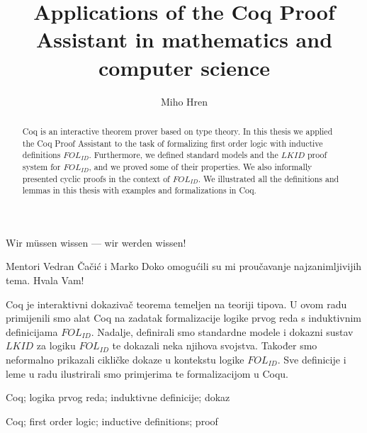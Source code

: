 \documentclass[diplomskirad, upload]{fer}
\title{Applications of the Coq Proof Assistant in mathematics and computer science}
\author{Miho Hren}
\theoremstyle{definition}
\theoremstyle{remark}
\begin{document}
\maketitle
{}

\begin{zahvale}
  \begin{center}
    \begin{huge}
      Wir m\"{u}ssen wissen --- wir werden wissen!
    \end{huge}
    Mentori Vedran Čačić i Marko Doko omogućili su mi proučavanje najzanimljivijih tema. Hvala Vam!
  \end{center}
\end{zahvale}

\mainmatter{}

\tableofcontents











\begin{sazetak}
  Coq je interaktivni dokazivač teorema temeljen na teoriji tipova.
  U ovom radu primijenili smo alat Coq na zadatak formalizacije
  logike prvog reda s induktivnim definicijama \(\mathit{FOL}_{\mathit{ID}}\). Nadalje,
  definirali smo standardne modele i dokazni sustav \(\mathit{LKID}\) za logiku \(\mathit{FOL}_{\mathit{ID}}\) te
  dokazali neka njihova svojstva. Također smo neformalno prikazali cikličke dokaze
  u kontekstu logike \(\mathit{FOL}_{\mathit{ID}}\).
  Sve definicije i leme u radu ilustrirali smo primjerima te formalizacijom u Coqu.  
\end{sazetak}

\begin{kljucnerijeci}
  Coq; logika prvog reda; induktivne definicije; dokaz
\end{kljucnerijeci}

\begin{abstract}
  Coq is an interactive theorem prover based on type theory.
  In this thesis we applied the Coq Proof Assistant to the task of formalizing
  first order logic with inductive definitions \(\mathit{FOL}_{\mathit{ID}}\). Furthermore,
  we defined standard models and the \(\mathit{LKID}\) proof system for \(\mathit{FOL}_{\mathit{ID}}\),
  and we proved some of their properties. We also informally presented cyclic proofs in the context of \(\mathit{FOL}_{\mathit{ID}}\).
  We illustrated all the definitions and lemmas in this thesis with examples and formalizations in Coq.
\end{abstract}

\begin{keywords}
  Coq; first order logic; inductive definitions; proof
\end{keywords}


\backmatter{}
\end{document}
